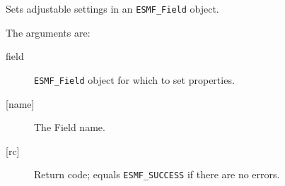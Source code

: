        Sets adjustable settings in an {\tt ESMF\_Field} object. 
  
       The arguments are:
       \begin{description}
       \item [field]
         {\tt ESMF\_Field} object for which to set properties.
       \item [{[name]}]
         The Field name.
       \item [{[rc]}]
         Return code; equals {\tt ESMF\_SUCCESS} if there are no errors.
       \end{description}
  
\setlength{\parskip}{\oldparskip}
\setlength{\parindent}{\oldparindent}
\setlength{\baselineskip}{\oldbaselineskip}
